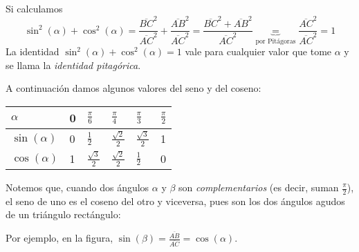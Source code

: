 \documentclass[../teoria.root.tex]{subfiles}
\begin{document}
Si calculamos \[\sin^2(\alpha)+\cos^2(\alpha)=\frac{\overline{BC}^2}{\overline{AC}^2}+\frac{\overline{AB}^2}{\overline{AC}^2}=\frac{\overline{BC}^2+\overline{AB}^2}{\overline{AC}^2}\underbrace{=}_{\text{por Pitágoras}}\frac{\overline{AC}^2}{\overline{AC}^2}=1\]
La identidad \(\sin^2(\alpha) + \cos^2(\alpha) = 1\) vale para cualquier valor que tome \(\alpha\) y se llama la \textit{identidad pitagórica}.

A continuación damos algunos valores del seno y del coseno:
\begin{center}
	\begin{tabularx}{\textwidth}{|X|X|X|X|X|X|}
		\hline
		\(\alpha\)       & 0 & \(\frac{\pi}{6}\)      & \(\frac{\pi}{4}\)      & \(\frac{\pi}{3}\)      & \(\frac{\pi}{2}\) \\\hline
		\(\sin(\alpha)\) & 0 & \(\frac{1}{2}\)        & \(\frac{\sqrt{2}}{2}\) & \(\frac{\sqrt{3}}{2}\) & 1                 \\\hline
		\(\cos(\alpha)\) & 1 & \(\frac{\sqrt{3}}{2}\) & \(\frac{\sqrt{2}}{2}\) & \(\frac{1}{2}\)        & 0                 \\\hline
	\end{tabularx}
\end{center}
Notemos que, cuando dos ángulos \(\alpha\) y \(\beta\) son \textit{complementarios} (es decir, suman \(\frac{\pi}{2}\)), el seno de uno es el coseno del otro y viceversa, pues son los dos ángulos agudos de un triángulo rectángulo:
\begin{center}
\end{center}
Por ejemplo, en la figura, \(\sin(\beta)=\frac{\overline{AB}}{\overline{AC}}=\cos(\alpha)\).
\end{document}
